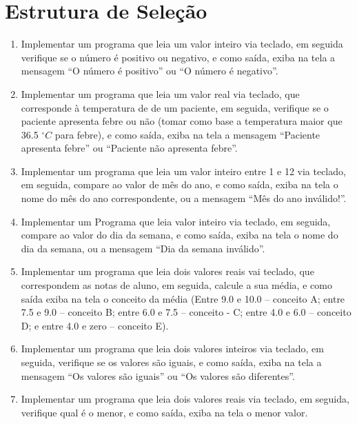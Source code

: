 \documentclass[11pt]{article}
\begin{document}
\newpage

\section{Estrutura de Seleção}

\begin{enumerate}
	\item Implementar um programa que leia um valor inteiro via teclado, em seguida verifique se o número
	é positivo ou negativo, e como saída, exiba na tela a mensagem ``O número é positivo'' ou ``O
	número é negativo''.
	
	\item  Implementar um programa que leia um valor real via teclado, que corresponde à temperatura de
	de um paciente, em seguida, verifique se o paciente apresenta febre ou não (tomar como base a
	temperatura maior que 36.5 $^{\circ}C$ para febre), e como saída, exiba na tela a mensagem ``Paciente
	apresenta febre'' ou ``Paciente não apresenta febre''.
	
	\item  Implementar um programa que leia um valor inteiro entre 1 e 12 via teclado, em seguida, compare
	ao valor de mês do ano, e como saída, exiba na tela o nome do mês do ano correspondente, ou a
	mensagem ``Mês do ano inválido!''.
	
	\item Implementar um Programa que leia valor inteiro via teclado, em seguida, compare ao valor do
	dia da semana, e como saída, exiba na tela o nome do dia da semana, ou a mensagem ``Dia da
	semana inválido''.
	
	\item  Implementar um programa que leia dois valores reais vai teclado, que correspondem as notas de
	aluno, em seguida, calcule a sua média, e como saída exiba na tela o conceito da média (Entre
	9.0 e 10.0 – conceito A; entre 7.5 e 9.0 – conceito B; entre 6.0 e 7.5 – conceito - C; entre 4.0 e
	6.0 – conceito D; e entre 4.0 e zero – conceito E).
	
	\item  Implementar um programa que leia dois valores inteiros via teclado, em seguida, verifique se os
	valores são iguais, e como saída, exiba na tela a mensagem ``Os valores são iguais'' ou ``Os valores
	são diferentes''.
	
	\item Implementar um programa que leia dois valores reais via teclado, em seguida, verifique qual é o
	menor, e como saída, exiba na tela o menor valor.
	

\end{enumerate}
\end{document}
